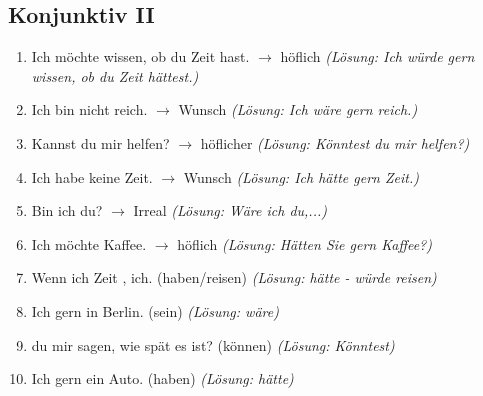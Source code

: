 \subsection{Konjunktiv II}
\begin{enumerate}
    \item Ich möchte wissen, ob du Zeit hast. $\rightarrow$ höflich \quad \textit{(Lösung: Ich würde gern wissen, ob du Zeit hättest.)}
    \item Ich bin nicht reich. $\rightarrow$ Wunsch \quad \textit{(Lösung: Ich wäre gern reich.)}
    \item Kannst du mir helfen? $\rightarrow$ höflicher \quad \textit{(Lösung: Könntest du mir helfen?)}
    \item Ich habe keine Zeit. $\rightarrow$ Wunsch \quad \textit{(Lösung: Ich hätte gern Zeit.)}
    \item Bin ich du? $\rightarrow$ Irreal \quad \textit{(Lösung: Wäre ich du,...)}
    \item Ich möchte Kaffee. $\rightarrow$ höflich \quad \textit{(Lösung: Hätten Sie gern Kaffee?)}
    \item Wenn ich Zeit \underline{\hspace{1cm}}, \underline{\hspace{1cm}} ich. (haben/reisen) \quad \textit{(Lösung: hätte - würde reisen)}
    \item Ich \underline{\hspace{1cm}} gern in Berlin. (sein) \quad \textit{(Lösung: wäre)}
    \item \underline{\hspace{1cm}} du mir sagen, wie spät es ist? (können) \quad \textit{(Lösung: Könntest)}
    \item Ich \underline{\hspace{1cm}} gern ein Auto. (haben) \quad \textit{(Lösung: hätte)}
\end{enumerate}

\chapterend